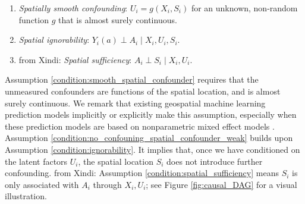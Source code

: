 \documentclass[12pt]{article}
\newcommand{\CP}[1]{{\color{purple}From Chan: #1}}
\newcommand{\XL}[1]{{\color{blue}from Xindi: #1}}
\begin{document}
  \begin{enumerate}[label=(A\arabic*), start=4]
\item \emph{Spatially smooth confounding}: $U_i = g(X_i,S_i)$ for an unknown, non-random function $g$ that is almost surely continuous. \label{condition:smooth_spatial_confounder} 
\item \emph{Spatial ignorability}: $Y_i(a)\perp A_i\mid X_i, U_i,S_i$.\label{condition:no_confouning_spatial_confounder_weak}
\item \XL{\emph{Spatial sufficiency}: $A_i\perp S_i\mid X_i,U_i$.} \label{condition:spatial_sufficiency}
 \end{enumerate}
Assumption \ref{condition:smooth_spatial_confounder} requires that the unmeasured confounders are functions of the spatial location, and is almost surely continuous. We remark that existing geospatial machine learning prediction models implicitly or explicitly make this assumption, especially when these prediction models are based on nonparametric mixed effect models \citep{sigrist2022gaussian,saha2023random,zhan2024neural}. Assumption \ref{condition:no_confouning_spatial_confounder_weak} builds upon Assumption \ref{condition:ignorability}. It implies that, once we have conditioned on the latent factors $U_i$, the spatial location $S_i$ does not introduce further confounding. \XL{Assumption \ref{condition:spatial_sufficiency} means $S_i$ is only associated with $A_i$ through $X_i,U_i$}; see Figure \ref{fig:causal_DAG} for a visual illustration. 



\end{document}
